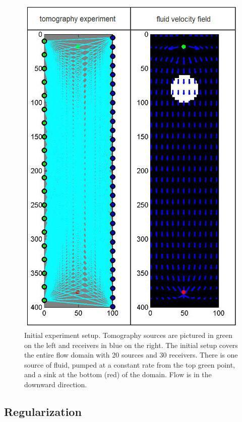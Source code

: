 \documentclass[11pt]{article}
\begin{document}
\begin{figure}
	\renewcommand{\arraystretch}{1.5}
	\begin{center}
		\iwidth=90mm			
			\includegraphics[width=1\iwidth]{figures/initialSetUp}			
	\end{center}
\caption{Initial experiment setup. Tomography sources are pictured in green on the left and receivers in blue on the right. The initial setup covers the entire flow domain with 20 sources and 30 receivers. There is one source of fluid, pumped at a constant rate from the top green point, and a sink at the bottom (red) of the domain. Flow is in the downward direction. }
\label{fig:surveyDesign}
\end{figure}
\subsection{Regularization}
\end{document}
